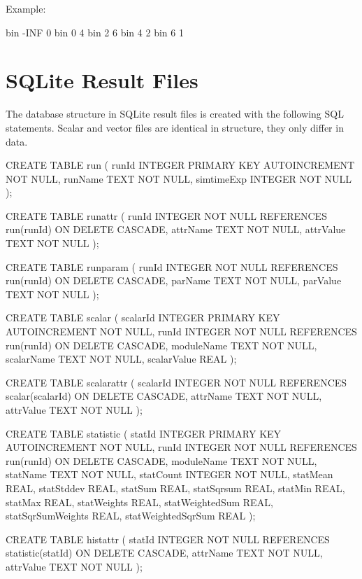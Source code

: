 Example:

\begin{filelisting}
bin -INF  0
bin 0 4
bin 2 6
bin 4 2
bin 6 1
\end{filelisting}


\section{SQLite Result Files}
\label{cha:result-file-formats:sqlite}

The database structure in SQLite result files is created with the
following SQL statements. Scalar and vector files are identical in
structure, they only differ in data.

\begin{filelisting}
CREATE TABLE run 
( 
    runId       INTEGER PRIMARY KEY AUTOINCREMENT NOT NULL, 
    runName     TEXT NOT NULL, 
    simtimeExp  INTEGER NOT NULL 
); 

CREATE TABLE runattr 
( 
    runId       INTEGER NOT NULL REFERENCES run(runId) ON DELETE CASCADE, 
    attrName    TEXT NOT NULL, 
    attrValue   TEXT NOT NULL 
); 

CREATE TABLE runparam 
( 
    runId       INTEGER NOT NULL REFERENCES run(runId) ON DELETE CASCADE, 
    parName     TEXT NOT NULL, 
    parValue    TEXT NOT NULL 
); 

CREATE TABLE scalar 
( 
    scalarId      INTEGER PRIMARY KEY AUTOINCREMENT NOT NULL, 
    runId         INTEGER NOT NULL REFERENCES run(runId) ON DELETE CASCADE, 
    moduleName    TEXT NOT NULL, 
    scalarName    TEXT NOT NULL, 
    scalarValue   REAL
); 

CREATE TABLE scalarattr 
( 
    scalarId      INTEGER NOT NULL REFERENCES scalar(scalarId) ON DELETE CASCADE, 
    attrName      TEXT NOT NULL, 
    attrValue     TEXT NOT NULL 
); 

CREATE TABLE statistic 
( 
    statId        INTEGER PRIMARY KEY AUTOINCREMENT NOT NULL, 
    runId         INTEGER NOT NULL REFERENCES run(runId) ON DELETE CASCADE, 
    moduleName    TEXT NOT NULL, 
    statName      TEXT NOT NULL, 
    statCount     INTEGER NOT NULL, 
    statMean      REAL, 
    statStddev    REAL, 
    statSum       REAL, 
    statSqrsum    REAL, 
    statMin       REAL, 
    statMax       REAL, 
    statWeights          REAL, 
    statWeightedSum      REAL, 
    statSqrSumWeights    REAL, 
    statWeightedSqrSum   REAL 
); 

CREATE TABLE histattr 
( 
    statId        INTEGER NOT NULL REFERENCES statistic(statId) ON DELETE CASCADE, 
    attrName      TEXT NOT NULL, 
    attrValue     TEXT NOT NULL 
); 


\end{filelisting}
